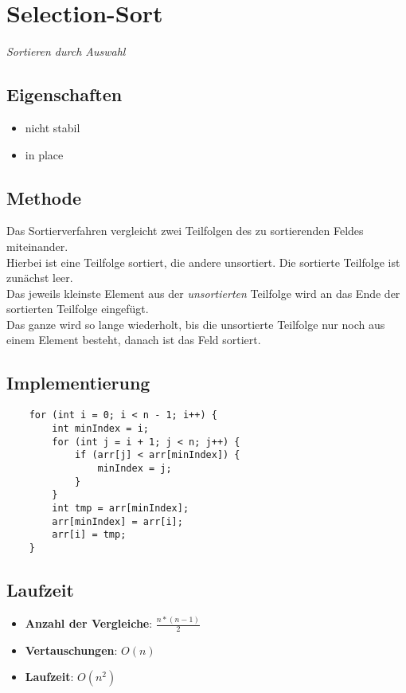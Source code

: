 \section{Selection-Sort}

\textit{Sortieren durch Auswahl}

\subsection{Eigenschaften}
\begin{itemize}
    \item nicht stabil
    \item in place
\end{itemize}

\subsection{Methode}
Das Sortierverfahren vergleicht zwei Teilfolgen des zu sortierenden Feldes miteinander.\\
Hierbei ist eine Teilfolge sortiert, die andere unsortiert.
Die sortierte Teilfolge ist zunächst leer.\\
Das jeweils kleinste Element aus der \textit{unsortierten} Teilfolge wird an das Ende der sortierten Teilfolge eingefügt.\\
Das ganze wird so lange wiederholt, bis die unsortierte Teilfolge nur noch aus einem Element besteht, danach ist das Feld sortiert.



\subsection{Implementierung}
\begin{verbatim}
    for (int i = 0; i < n - 1; i++) {
        int minIndex = i;
        for (int j = i + 1; j < n; j++) {
            if (arr[j] < arr[minIndex]) {
                minIndex = j;
            }
        }
        int tmp = arr[minIndex];
        arr[minIndex] = arr[i];
        arr[i] = tmp;
    }
\end{verbatim}


\subsection{Laufzeit}
\begin{itemize}
    \item \textbf{Anzahl der Vergleiche}: $\frac{n * ( n - 1)}{2}$
    \item \textbf{Vertauschungen}: $O(n)$
    \item \textbf{Laufzeit}: $O(n^2)$
\end{itemize}